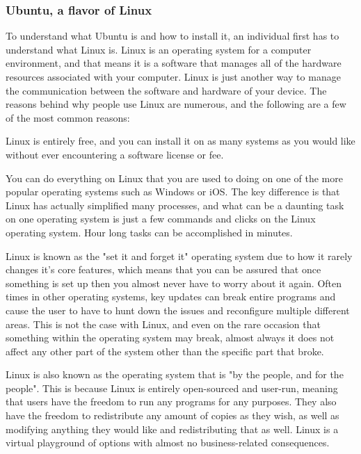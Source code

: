 \documentclass[12pt]{report}
\begin{document}
\subsubsection*{Ubuntu, a flavor of Linux}
To understand what Ubuntu is and how to install it, an individual first has to understand what Linux is. Linux is an operating system for a computer environment, and that means it is a software that manages all of the hardware resources associated with your computer. Linux is just another way to manage the communication between the software and hardware of your device.\cite{LinuxExplaination} The reasons behind why people use Linux are numerous, and the following are a few of the most common reasons:
\begin{description}[font=$\bullet$~\normalfont\scshape\color{red!50!black}]
	\item [Zero Cost of Entry] Linux is entirely free, and you can install it on as many systems as you would like without ever encountering a software license or fee. 
	\item [Usability] You can do everything on Linux that you are used to doing on one of the more popular operating systems such as Windows or iOS. The key difference is that Linux has actually simplified many processes, and what can be a daunting task on one operating system is just a few commands and clicks on the Linux operating system. Hour long tasks can be accomplished in minutes. 
	\item [System Administration] Linux is known as the "set it and forget it" operating system due to how it rarely changes it's core features, which means that you can be assured that once something is set up then you almost never have to worry about it again. Often times in other operating systems, key updates can break entire programs and cause the user to have to hunt down the issues and reconfigure multiple different areas. This is not the case with Linux, and even on the rare occasion that something within the operating system may break, almost always it does not affect any other part of the system other than the specific part that broke. 
	\item [Open Source Licensing] Linux is also known as the operating system that is "by the people, and for the people". This is because Linux is entirely open-sourced and user-run, meaning that users have the freedom to run any programs for any purposes. They also have the freedom to redistribute any amount of copies as they wish, as well as modifying anything they would like and redistributing that as well. Linux is a virtual playground of options with almost no business-related consequences. 
\end{description}
\end{document}

